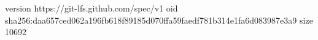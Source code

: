 version https://git-lfs.github.com/spec/v1
oid sha256:daa657ced062a196fb618f89185d070ffa59faedf781b314e1fa6d083987e3a9
size 10692

